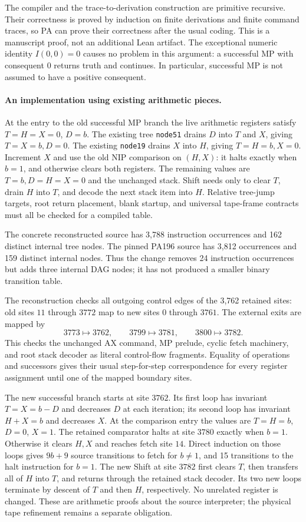 The compiler and the trace-to-derivation construction are primitive
recursive.  Their correctness is proved by induction on finite derivations
and finite command traces, so PA can prove their correctness after the
usual coding.  This is a manuscript proof, not an additional Lean artifact.
The exceptional numeric identity $I(0,0)=0$ causes no problem in this
argument: a successful MP with consequent $0$ returns truth and continues.
In particular, successful MP is not assumed to have a positive consequent.

\paragraph{An implementation using existing arithmetic pieces.}
At the entry to the old successful MP branch the live arithmetic registers
satisfy $T=H=X=0$, $D=b$.  The existing tree \texttt{node51} drains $D$
into $T$ and $X$, giving $T=X=b,D=0$.  The existing \texttt{node19}
drains $X$ into $H$, giving $T=H=b,X=0$.  Increment $X$ and use the
old NIP comparison on $(H,X)$: it halts exactly when $b=1$, and otherwise
clears both registers.  The remaining values are $T=b,D=H=X=0$ and the
unchanged stack.  Shift needs only to clear $T$, drain $H$ into $T$, and
decode the next stack item into $H$.  Relative tree-jump targets, root
return placement, blank startup, and universal tape-frame contracts must
all be checked for a compiled table.

The concrete reconstructed source has 3,788 instruction occurrences and
162 distinct internal tree nodes.  The pinned PA196 source has 3,812
occurrences and 159 distinct internal nodes.  Thus the change removes
24 instruction occurrences but adds three internal DAG nodes; it has not
produced a smaller binary transition table.

The reconstruction checks all outgoing control edges of the 3,762 retained
sites: old sites $11$ through $3772$ map to new sites $0$ through $3761$.
The external exits are mapped by
\[
 3773\mapsto3762,\qquad3799\mapsto3781,\qquad3800\mapsto3782.
\]
This checks the unchanged AX command, MP prelude, cyclic fetch machinery,
and root stack decoder as literal control-flow fragments.  Equality of
operations and successors gives their usual step-for-step correspondence
for every register assignment until one of the mapped boundary sites.

The new successful branch starts at site $3762$.  Its first loop has
invariant $T=X=b-D$ and decreases $D$ at each iteration; its second loop
has invariant $H+X=b$ and decreases $X$.  At the comparison entry the
values are $T=H=b$, $D=0$, $X=1$.  The retained comparator halts at site
$3780$ exactly when $b=1$.  Otherwise it clears $H,X$ and reaches fetch
site $14$.  Direct induction on those loops gives $9b+9$ source transitions
to fetch for $b\ne1$, and 15 transitions to the halt instruction for $b=1$.
The new Shift at site $3782$ first clears $T$, then transfers all of $H$
into $T$, and returns through the retained stack decoder.  Its two new
loops terminate by descent of $T$ and then $H$, respectively.  No unrelated
register is changed.  These are arithmetic proofs about the source
interpreter; the physical tape refinement remains a separate obligation.

